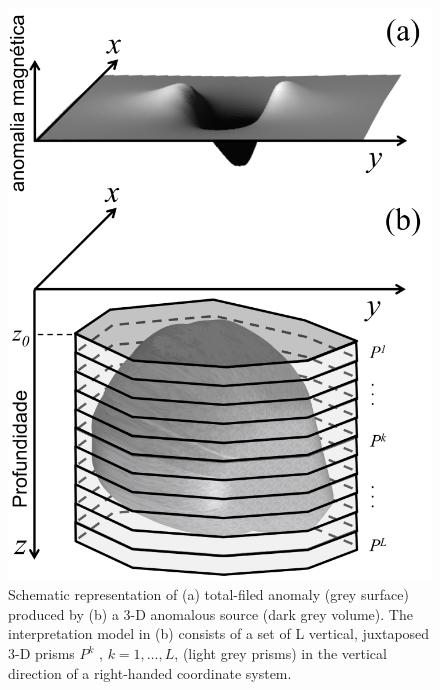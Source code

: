 \documentclass[extra,mreferee]{gji}
\begin{document}
\begin{figure}
    \centering
    \includegraphics[scale=0.3]{figures/observed_data.png}
    \caption{Schematic representation of (a) total-filed anomaly (grey surface) produced by (b) a 3-D anomalous source (dark grey volume). The interpretation model in (b) consists of a set of L vertical, juxtaposed 3-D prisms $P^k$ , $k = 1,\dots, L$, (light grey prisms) in the vertical direction of a right-handed coordinate system.}
    \label{fig:obs}
\end{figure}
\end{document}
